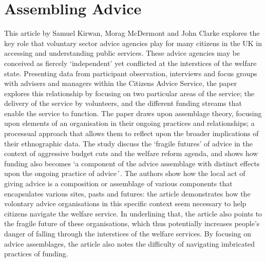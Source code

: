 \section{Assembling Advice}
This article by Samuel Kirwan, Morag McDermont and John Clarke explores the key role that voluntary sector advice agencies play for many citizens in the UK in accessing and understanding public services. These advice agencies may be conceived as fiercely ‘independent’ yet conflicted at the interstices of the welfare state. Presenting data from participant observation, interviews and focus groups with advisers and managers within the Citizens Advice Service, the paper explores this relationship by focusing on two particular areas of the service; the delivery of the service by volunteers, and the different funding streams that enable the service to function. The paper draws upon assemblage theory, focusing upon elements of an organisation in their ongoing practices and relationships; a processual approach that allows them to reflect upon the broader implications of their ethnographic data. The study discuss the ‘fragile futures’ of advice in the context of aggressive budget cuts and the welfare reform agenda, and shows how funding also becomes ‘a component of the advice assemblage with distinct effects upon the ongoing practice of advice´. The authors show how the local act of giving advice is a composition or assemblage of various components that encapsulates various sites, pasts and futures: the article demonstrates how the volontary advice organisations in this specific context seem necessary to help citizens navigate the welfare service. In underlining that, the article also points to the fragile future of these organisations, which thus potentially increases people’s danger of falling through the interstices of the welfare services. By focusing on advice assemblages, the article also notes the difficulty of navigating imbricated practices of funding.

